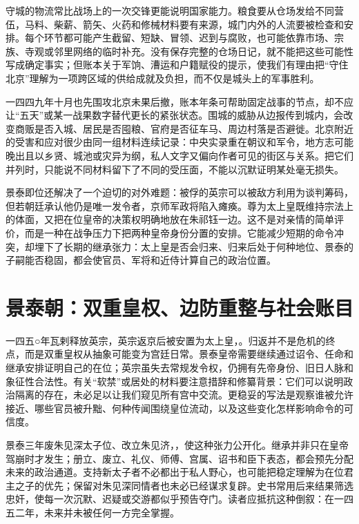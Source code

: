 守城的物流常比战场上的一次交锋更能说明国家能力。粮食要从仓场发给不同营伍，马料、柴薪、箭矢、火药和修械材料要有来源，城门内外的人流要被检查和安排。每个环节都可能产生截留、短缺、冒领、迟到与腐败，也可能依靠市场、宗族、寺观或邻里网络的临时补充。没有保存完整的仓场日记，就不能把这些可能性写成确定事实；但账本关于军饷、漕运和户籍赋役的提示，使我们有理由把“守住北京”理解为一项跨区域的供给成就及负担，而不仅是城头上的军事胜利。

一四四九年十月也先围攻北京未果后撤，账本年条可帮助固定战事的节点，却不应让“五天”或某一战果数字替代更长的紧张状态。围城的威胁从边报传到城内，会改变商贩是否入城、居民是否囤粮、官府是否征车马、周边村落是否避徙。北京附近的受害和应对很少由同一组材料连续记录：中央实录重在朝议和军令，地方志可能晚出且以乡贤、城池或灾异为纲，私人文字又偏向作者可见的街区与关系。把它们并列时，只能说不同材料留下了不同的受压面，不能以沉默证明某处毫无损失。

景泰即位还解决了一个迫切的对外难题：被俘的英宗可以被敌方利用为谈判筹码，但若朝廷承认他仍是唯一发令者，京师军政将陷入瘫痪。尊为太上皇既维持宗法上的体面，又把在位皇帝的决策权明确地放在朱祁钰一边。这不是对亲情的简单评价，而是一种在战争压力下把两种皇帝身份分置的安排。它能减少短期的命令冲突，却埋下了长期的继承张力：太上皇是否会归来、归来后处于何种地位、景泰的子嗣能否稳固，都会使官员、军将和近侍计算自己的政治位置。

\section{景泰朝：双重皇权、边防重整与社会账目}

一四五○年瓦剌释放英宗，英宗返京后被安置为太上皇，。归返并不是危机的终点，而是双重皇权从抽象可能变为宫廷日常。景泰皇帝需要继续通过诏令、任命和继承安排证明自己的在位；英宗虽失去常规发令权，仍拥有先帝身份、旧日人脉和象征性合法性。有关“软禁”或居处的材料要注意措辞和修纂背景：它们可以说明政治隔离的存在，未必足以让我们窥见所有宫中交流。更稳妥的写法是观察谁被允许接近、哪些官员被升黜、何种传闻围绕皇位流动，以及这些变化怎样影响命令的可信度。

景泰三年废朱见深太子位、改立朱见济，，使这种张力公开化。继承并非只在皇帝驾崩时才发生；册立、废立、礼仪、师傅、宫属、诏书和臣下表态，都会预先分配未来的政治通道。支持新太子者不必都出于私人野心，也可能把稳定理解为在位君主之子的优先；保留对朱见深同情者也未必已经谋求复辟。史书常用后来结果筛选忠奸，使每一次沉默、迟疑或交游都似乎预告夺门。读者应抵抗这种倒叙：在一四五二年，未来并未被任何一方完全掌握。

